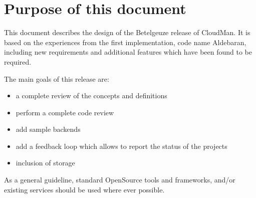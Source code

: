 \section{Purpose of this document} 

This document describes the design of the Betelgeuze release of CloudMan. It is based on the experiences from the first implementation, code name Aldebaran, including new requirements and additional features which have been found to be required. 

The main goals of this release are:
\begin{itemize}
\item a complete review of the concepts and definitions
\item perform a complete code review 
\item add sample backends
\item add a feedback loop which allows to report the status of the projects
\item inclusion of storage
\end{itemize}

As a general guideline, standard OpenSource tools and frameworks, and/or existing services should be used where ever possible. 

